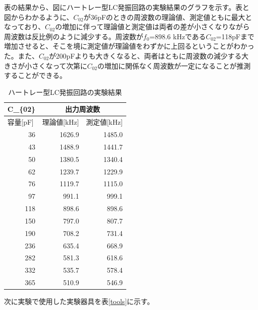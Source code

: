 \documentclass[a4paper,uplatex]{jsarticle}
\begin{document}
表の結果から、図にハートレー型LC発振回路の実験結果のグラフを示す。表と
図からわかるように、$C_{02}$が36pFのときの周波数の理論値、測定値ともに最大と
なっており、$C_{02}$の増加に伴って理論値と測定値は両者の差が小さくなりながら
周波数は反比例のように減少する。周波数が$f_0$=898.6 kHzである$C_{02}$=118pFまで
増加させると、そこを境に測定値が理論値をわずかに上回るということがわかっ
た。また、$C_{02}$が200pFよりも大きくなると、両者はともに周波数の減少する大
きさが小さくなって次第に$C_{02}$の増加に関係なく周波数が一定になることが推測
することができる。

\begin{table}[http]
	\centering
	\caption{ハートレー型LC発振回路の実験結果}
	\label{hartley}
	\begin{tabular}{|r|rr|}
		\hline
		\multicolumn{1}{|c|}{C\_\{02\}}  & \multicolumn{2}{c|}{出力周波数}                                            \\ \hline
		\multicolumn{1}{|l|}{容量{[}pF{]}} & \multicolumn{1}{l|}{理論値{[}kHz{]}} & \multicolumn{1}{l|}{測定値{[}kHz{]}} \\ \hline
		36                               & \multicolumn{1}{r|}{1626.9}       & 1485.0                            \\ \hline
		43                               & \multicolumn{1}{r|}{1488.9}       & 1441.7                            \\ \hline
		50                               & \multicolumn{1}{r|}{1380.5}       & 1340.4                            \\ \hline
		62                               & \multicolumn{1}{r|}{1239.7}       & 1229.9                            \\ \hline
		76                               & \multicolumn{1}{r|}{1119.7}       & 1115.0                            \\ \hline
		97                               & \multicolumn{1}{r|}{991.1}        & 999.1                             \\ \hline
		118                              & \multicolumn{1}{r|}{898.6}        & 898.6                             \\ \hline
		150                              & \multicolumn{1}{r|}{797.0}        & 807.7                             \\ \hline
		190                              & \multicolumn{1}{r|}{708.2}        & 731.4                             \\ \hline
		236                              & \multicolumn{1}{r|}{635.4}        & 668.9                             \\ \hline
		282                              & \multicolumn{1}{r|}{581.3}        & 618.6                             \\ \hline
		332                              & \multicolumn{1}{r|}{535.7}        & 578.4                             \\ \hline
		365                              & \multicolumn{1}{r|}{510.9}        & 546.9                             \\ \hline
	\end{tabular}
\end{table}
次に実験で使用した実験器具を表\ref{tools}に示す。
\end{document}
